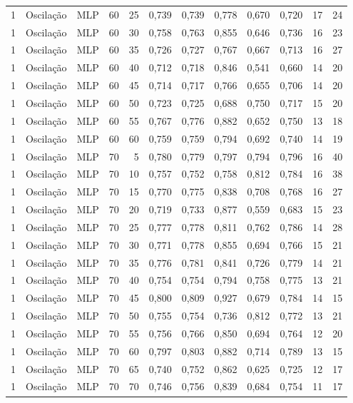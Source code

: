 \begin{longtable}{@{}rllrrrrrrrrr@{}}
1 & Oscilação & MLP & 60 & 25 & 0,739 & 0,739 & 0,778 & 0,670 & 0,720 & 17 & 24 \\
1 & Oscilação & MLP & 60 & 30 & 0,758 & 0,763 & 0,855 & 0,646 & 0,736 & 16 & 23 \\
1 & Oscilação & MLP & 60 & 35 & 0,726 & 0,727 & 0,767 & 0,667 & 0,713 & 16 & 27 \\
1 & Oscilação & MLP & 60 & 40 & 0,712 & 0,718 & 0,846 & 0,541 & 0,660 & 14 & 20 \\
1 & Oscilação & MLP & 60 & 45 & 0,714 & 0,717 & 0,766 & 0,655 & 0,706 & 14 & 20 \\
1 & Oscilação & MLP & 60 & 50 & 0,723 & 0,725 & 0,688 & 0,750 & 0,717 & 15 & 20 \\
1 & Oscilação & MLP & 60 & 55 & 0,767 & 0,776 & 0,882 & 0,652 & 0,750 & 13 & 18 \\
1 & Oscilação & MLP & 60 & 60 & 0,759 & 0,759 & 0,794 & 0,692 & 0,740 & 14 & 19 \\
1 & Oscilação & MLP & 70 & 5 & 0,780 & 0,779 & 0,797 & 0,794 & 0,796 & 16 & 40 \\
1 & Oscilação & MLP & 70 & 10 & 0,757 & 0,752 & 0,758 & 0,812 & 0,784 & 16 & 38 \\
1 & Oscilação & MLP & 70 & 15 & 0,770 & 0,775 & 0,838 & 0,708 & 0,768 & 16 & 27 \\
1 & Oscilação & MLP & 70 & 20 & 0,719 & 0,733 & 0,877 & 0,559 & 0,683 & 15 & 23 \\
1 & Oscilação & MLP & 70 & 25 & 0,777 & 0,778 & 0,811 & 0,762 & 0,786 & 14 & 28 \\
1 & Oscilação & MLP & 70 & 30 & 0,771 & 0,778 & 0,855 & 0,694 & 0,766 & 15 & 21 \\
1 & Oscilação & MLP & 70 & 35 & 0,776 & 0,781 & 0,841 & 0,726 & 0,779 & 14 & 21 \\
1 & Oscilação & MLP & 70 & 40 & 0,754 & 0,754 & 0,794 & 0,758 & 0,775 & 13 & 21 \\
1 & Oscilação & MLP & 70 & 45 & 0,800 & 0,809 & 0,927 & 0,679 & 0,784 & 14 & 15 \\
1 & Oscilação & MLP & 70 & 50 & 0,755 & 0,754 & 0,736 & 0,812 & 0,772 & 13 & 21 \\
1 & Oscilação & MLP & 70 & 55 & 0,756 & 0,766 & 0,850 & 0,694 & 0,764 & 12 & 20 \\
1 & Oscilação & MLP & 70 & 60 & 0,797 & 0,803 & 0,882 & 0,714 & 0,789 & 13 & 15 \\
1 & Oscilação & MLP & 70 & 65 & 0,740 & 0,752 & 0,862 & 0,625 & 0,725 & 12 & 17 \\
1 & Oscilação & MLP & 70 & 70 & 0,746 & 0,756 & 0,839 & 0,684 & 0,754 & 11 & 17 \\

\end{longtable}
